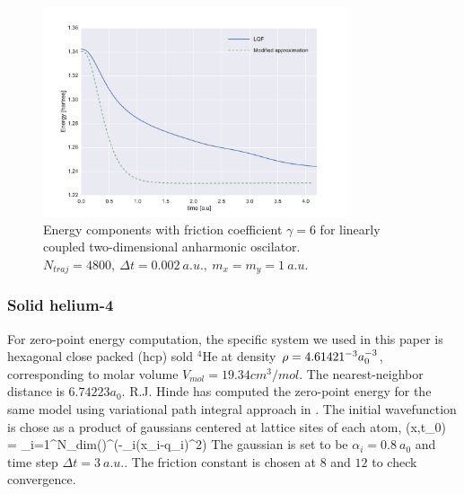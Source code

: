 \documentclass[11pt,letter,nocenter]{revtex4-1}
\begin{document}
\begin{figure}[htbp]
\includegraphics[width=0.8\textwidth]{figs/2d.pdf}
\caption{Energy components with friction coefficient $\gamma = 6$ for linearly coupled two-dimensional anharmonic oscilator. $N_{traj} = 4800,~ \Delta t = 0.002~a.u., ~m_x = m_y =1~a.u.$}
\label{fig:2d_model}
\end{figure}

\subsubsection{Solid helium-4}
For zero-point energy computation, the specific system we used in this paper is hexagonal close packed (hcp) sold $^4$He at density $\rho = 4.61421 \time 10^{-3} a_0^{-3}$, corresponding to molar volume $V_{mol} = 19.34 cm^3/ mol$. The nearest-neighbor distance is $6.74223 a_0$. R.J. Hinde has computed the zero-point energy for the same model using variational path integral approach in \cite{Hinde2011}. 
The initial wavefunction is chose as a product of gaussians centered at lattice sites of each atom, 
\be \psi(\bm x,t_0) = \prod_{i=1}^{N_{dim}}\left(\right)^{}\exp(-{\alpha_i}(x_i-q_i)^2) \ee  
The gaussian is set to be $\alpha_i = 0.8 ~a_0$ and time step $\Delta t = 3 ~a.u.$. The friction constant is chosen at $8$ and $12$ to check convergence. 
 
\end{document}
